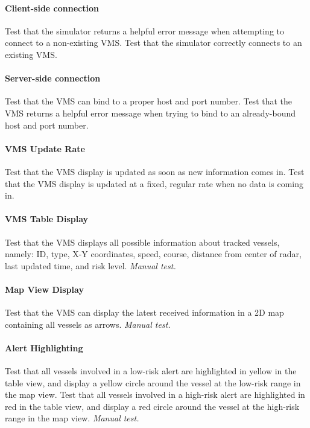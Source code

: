 \documentclass{article}
\begin{document}
\paragraph{Client-side connection \\}
Test that the simulator returns a helpful error message when attempting to connect to a non-existing VMS. Test that the simulator correctly connects to an existing VMS.

\paragraph{Server-side connection \\}
Test that the VMS can bind to a proper host and port number. Test that the VMS returns a helpful error message when trying to bind to an already-bound host and port number.

\paragraph{VMS Update Rate \\}
Test that the VMS display is updated as soon as new information comes in. Test that the VMS display is updated at a fixed, regular rate when no data is coming in.

\paragraph{VMS Table Display \\}
Test that the VMS displays all possible information about tracked vessels, namely: ID, type, X-Y coordinates, speed, course, distance from center of radar, last updated time, and risk level. \emph{Manual test.}

\paragraph{Map View Display \\}
Test that the VMS can display the latest received information in a 2D map containing all vessels as arrows. \emph{Manual test.}

\paragraph{Alert Highlighting \\}
Test that all vessels involved in a low-risk alert are highlighted in yellow in the table view, and display a yellow circle around the vessel at the low-risk range in the map view. Test that all vessels involved in a high-risk alert are highlighted in red in the table view, and display a red circle around the vessel at the high-risk range in the map view. \emph{Manual test.}
\end{document}
